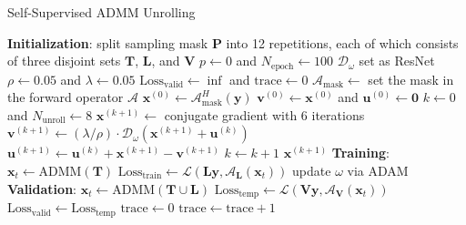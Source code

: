 \documentclass[AMA,STIX2COL,Linenumberson]{MRM}
\begin{document}
\begin{algorithm}
    \caption{Self-Supervised ADMM Unrolling} \label{ALG:ADMM}
    \begin{algorithmic}[1]
        \State \textbf{Initialization}:
        \State \;\; split sampling mask $\mathbf{P}$ into 12 repetitions, each of which consists of three disjoint sets $\mathbf{T}$, $\mathbf{L}$, and $\mathbf{V}$
        \State \;\: $p \gets 0$ and $N_{\mathrm{epoch}} \gets 100$
        \State \;\; $\mathcal{D}_{\omega}$ set as ResNet
        \State \;\; $\rho \gets 0.05$ and $\lambda \gets 0.05$
        \State \;\; $\mathrm{Loss}_{\mathrm{valid}} \gets \inf$ and $\mathrm{trace} \gets 0$
        \State $\mathcal{A}_\mathrm{mask} \gets$ set the mask in the forward operator $\mathcal{A}$
        \State $\mathbf{x}^{(0)} \gets \mathcal{A}_\mathrm{mask}^H (\mathbf{y})$
        \State $\mathbf{v}^{(0)} \gets \mathbf{x}^{(0)}$ and $\mathbf{u}^{(0)} \gets \mathbf{0}$
        \State $k \gets 0$ and $N_{\mathrm{unroll}} \gets 8$
        \State $\mathbf{x}^{(k+1)} \gets $ conjugate gradient with 6 iterations
        \State $\mathbf{v}^{(k+1)} \gets (\lambda/\rho) \cdot \mathcal{D}_{\omega} (\mathbf{x}^{(k+1)} + \mathbf{u}^{(k)})$
        \State $\mathbf{u}^{(k+1)} \gets \mathbf{u}^{(k)} + \mathbf{x}^{(k+1)} - \mathbf{v}^{(k+1)}$
        \State $k \gets k+1$
        \EndWhile
        \State \Return $\mathbf{x}^{(k+1)}$
        \EndFunction
        \State \textbf{Training}:
        \State $\mathbf{x}_t \gets \mathrm{ADMM}(\mathbf{T})$
        \State $\mathrm{Loss}_{\mathrm{train}} \gets \mathcal{L}(\mathbf{L} \mathbf{y}, \mathcal{A}_\mathbf{L}(\mathbf{x}_t))$
        \State update $\omega$ via ADAM
        \State \textbf{Validation}:
        \State $\mathbf{x}_t \gets \mathrm{ADMM}(\mathbf{T} \cup \mathbf{L})$
        \State $\mathrm{Loss}_{\mathrm{temp}} \gets \mathcal{L}(\mathbf{V} \mathbf{y}, \mathcal{A}_\mathbf{V}(\mathbf{x}_t))$
        \State $\mathrm{Loss}_{\mathrm{valid}} \gets \mathrm{Loss}_{\mathrm{temp}}$
        \State $\mathrm{trace} \gets 0$
        \Else
        \State $\mathrm{trace} \gets \mathrm{trace} + 1$
        \EndIf
        \EndWhile
    \end{algorithmic}
\end{algorithm}
\end{document}
